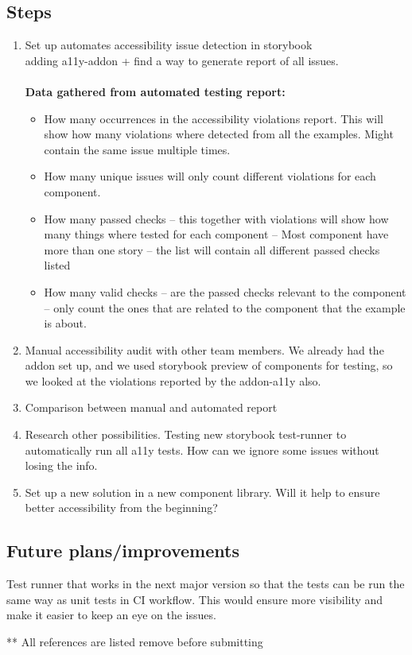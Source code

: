 \documentclass{master_thesis}
\begin{document}
\subsection{Steps}
\begin{enumerate}
	\item Set up automates accessibility issue detection in storybook \\
	adding a11y-addon + find a way to generate report of all issues. \\ \\
	\textbf{Data gathered from automated testing report:}
	\begin{itemize}
		\item How many occurrences in the accessibility violations report. This will show how many violations where detected from all the examples. Might contain the same issue multiple times.
		\item How many unique issues will only count different violations for each component.
		\item How many passed checks – this together with violations will show how many things where tested for each component – Most component have more than one story – the list will contain all different passed checks listed
		\item How many valid checks – are the passed checks relevant to the component – only count the ones that are related to the component that the example is about.
	\end{itemize}
	\item Manual accessibility audit with other team members. We already had the addon set up, and we used storybook preview of components for testing, so we looked at the violations reported by the addon-a11y also.
	\item Comparison between manual and automated report
	\item Research other possibilities. Testing new storybook test-runner to automatically run all a11y tests. How can we ignore some issues without losing the info.
	\item Set up a new solution in a new component library. Will it help to ensure better accessibility from the beginning?
\end{enumerate}

\subsection{Future plans/improvements}
Test runner that works in the next major version so that the tests can be run the same way as unit tests in CI workflow. This would ensure more visibility and make it easier to keep an eye on the issues.


\pagebreak
** All references are listed remove before submitting
\printbibliography{}
\end{document}

